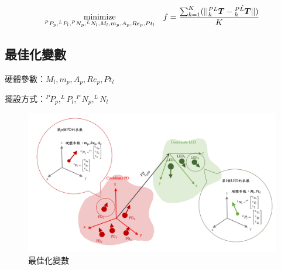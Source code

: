 \begin{equation}
    \label{eqn:objective}
    \underset{^{P}P_p, ^{L}P_l,^{P}N_p, ^{L}N_l,M_l,m_p,A_p,Re_p,Pt_l}{\operatorname{minimize}} 
    \quad f = 
    \frac{\sum_{k=1}^{K}(||^{PL}_k\boldsymbol{T} -\hat{^{PL}_k\boldsymbol{T} } ||)}{K}  \\
\end{equation}

\subsection{最佳化變數}

硬體參數：$M_l,m_p,A_p,Re_p,Pt_l$

擺設方式：$^{P}P_p, ^{L}P_l,^{P}N_p, ^{L}N_l$

\begin{figure}[ht]
    \centering
    \includegraphics[width=12cm]{ch4pic/variable.png}
    \caption{最佳化變數}
    \label{pic:variable}
\end{figure}